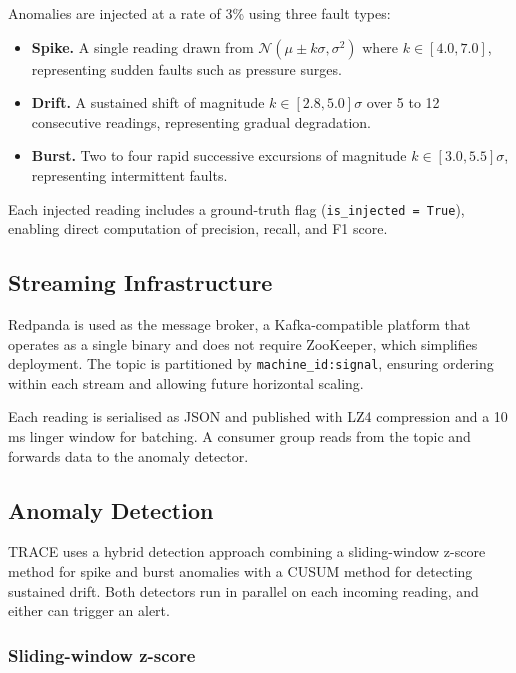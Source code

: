 \documentclass[11pt, a4paper]{article}
\begin{document}
Anomalies are injected at a rate of 3\% using three fault types:

\begin{itemize}
    \item \textbf{Spike.} A single reading drawn from 
    $\mathcal{N}(\mu \pm k\sigma, \sigma^2)$ where $k \in [4.0, 7.0]$, 
    representing sudden faults such as pressure surges.

    \item \textbf{Drift.} A sustained shift of magnitude 
    $k \in [2.8, 5.0]\sigma$ over 5 to 12 consecutive readings, 
    representing gradual degradation.

    \item \textbf{Burst.} Two to four rapid successive excursions of 
    magnitude $k \in [3.0, 5.5]\sigma$, representing intermittent faults.
\end{itemize}

Each injected reading includes a ground-truth flag 
(\texttt{is\_injected = True}), enabling direct computation of 
precision, recall, and F1 score.

\subsection{Streaming Infrastructure}

Redpanda is used as the message broker, a Kafka-compatible platform 
that operates as a single binary and does not require ZooKeeper, which 
simplifies deployment. The topic is partitioned by 
\texttt{machine\_id:signal}, ensuring ordering within each stream and 
allowing future horizontal scaling.

Each reading is serialised as JSON and published with LZ4 compression 
and a 10\,ms linger window for batching. A consumer group reads from 
the topic and forwards data to the anomaly detector.

\subsection{Anomaly Detection}

TRACE uses a hybrid detection approach combining a sliding-window 
z-score method for spike and burst anomalies with a CUSUM method for 
detecting sustained drift. Both detectors run in parallel on each 
incoming reading, and either can trigger an alert.

\subsubsection{Sliding-window z-score}
\end{document}
